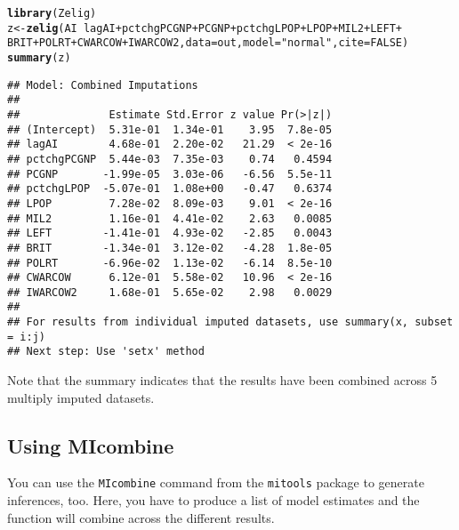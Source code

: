 \documentclass[12pt]{article}\usepackage[]{graphicx}\usepackage[]{color}
\makeatletter
\newcommand{\hlnum}[1]{\textcolor[rgb]{0.686,0.059,0.569}{#1}}%
\newcommand{\hlstr}[1]{\textcolor[rgb]{0.192,0.494,0.8}{#1}}%
\newcommand{\hlopt}[1]{\textcolor[rgb]{0,0,0}{#1}}%
\newcommand{\hlstd}[1]{\textcolor[rgb]{0.345,0.345,0.345}{#1}}%
\newcommand{\hlkwb}[1]{\textcolor[rgb]{0.69,0.353,0.396}{#1}}%
\newcommand{\hlkwc}[1]{\textcolor[rgb]{0.333,0.667,0.333}{#1}}%
\newcommand{\hlkwd}[1]{\textcolor[rgb]{0.737,0.353,0.396}{\textbf{#1}}}%
\newenvironment{kframe}{%
 \def\at@end@of@kframe{}%
 \ifinner\ifhmode%
  \def\at@end@of@kframe{\end{minipage}}%
  \begin{minipage}{\columnwidth}%
 \fi\fi%
 \def\FrameCommand##1{\hskip\@totalleftmargin \hskip-\fboxsep
 \colorbox{shadecolor}{##1}\hskip-\fboxsep
     \hskip-\linewidth \hskip-\@totalleftmargin \hskip\columnwidth}%
 \MakeFramed {\advance\hsize-\width
   \@totalleftmargin\z@ \linewidth\hsize
   \@setminipage}}%
 {\par\unskip\endMakeFramed%
 \at@end@of@kframe}
\newenvironment{knitrout}{}{} %
\makeatother
\begin{document}
\begin{scriptsize}
\begin{knitrout}
\color{fgcolor}\begin{kframe}
\begin{alltt}
\hlkwd{library}\hlstd{(Zelig)}
\hlstd{z} \hlkwb{<-} \hlkwd{zelig}\hlstd{(AI} \hlopt{~} \hlstd{lagAI} \hlopt{+} \hlstd{pctchgPCGNP} \hlopt{+} \hlstd{PCGNP} \hlopt{+} \hlstd{pctchgLPOP} \hlopt{+} \hlstd{LPOP} \hlopt{+} \hlstd{MIL2} \hlopt{+} \hlstd{LEFT} \hlopt{+}
    \hlstd{BRIT} \hlopt{+} \hlstd{POLRT} \hlopt{+} \hlstd{CWARCOW} \hlopt{+} \hlstd{IWARCOW2,} \hlkwc{data}\hlstd{=out,} \hlkwc{model}\hlstd{=}\hlstr{"normal"}\hlstd{,} \hlkwc{cite}\hlstd{=}\hlnum{FALSE}\hlstd{)}
\hlkwd{summary}\hlstd{(z)}
\end{alltt}
\begin{verbatim}
## Model: Combined Imputations 
## 
##              Estimate Std.Error z value Pr(>|z|)
## (Intercept)  5.31e-01  1.34e-01    3.95  7.8e-05
## lagAI        4.68e-01  2.20e-02   21.29  < 2e-16
## pctchgPCGNP  5.44e-03  7.35e-03    0.74   0.4594
## PCGNP       -1.99e-05  3.03e-06   -6.56  5.5e-11
## pctchgLPOP  -5.07e-01  1.08e+00   -0.47   0.6374
## LPOP         7.28e-02  8.09e-03    9.01  < 2e-16
## MIL2         1.16e-01  4.41e-02    2.63   0.0085
## LEFT        -1.41e-01  4.93e-02   -2.85   0.0043
## BRIT        -1.34e-01  3.12e-02   -4.28  1.8e-05
## POLRT       -6.96e-02  1.13e-02   -6.14  8.5e-10
## CWARCOW      6.12e-01  5.58e-02   10.96  < 2e-16
## IWARCOW2     1.68e-01  5.65e-02    2.98   0.0029
## 
## For results from individual imputed datasets, use summary(x, subset = i:j)
## Next step: Use 'setx' method
\end{verbatim}
\end{kframe}
\end{knitrout}

\end{scriptsize}
Note that the summary indicates that the results have been combined across 5 multiply imputed datasets. 

\subsection{Using MIcombine}

You can use the \verb"MIcombine" command from the \verb"mitools" package to generate inferences, too.  Here, you have to produce a list of model estimates and the function will combine across the different results.  
\end{document}

